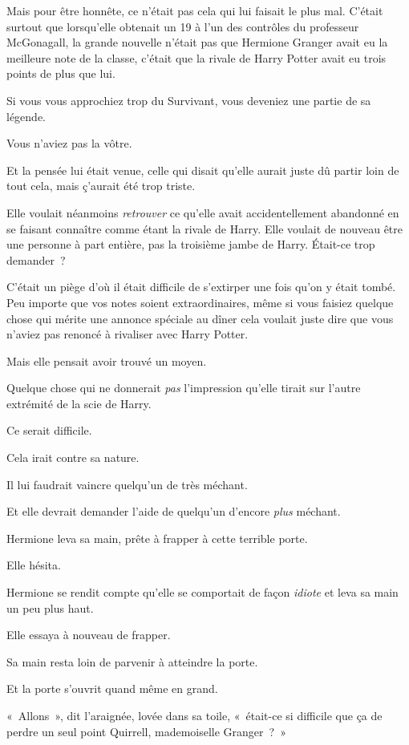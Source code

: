 Mais pour être honnête, ce n'était pas cela qui lui faisait le plus mal. C'était surtout que lorsqu'elle obtenait un 19 à l'un des contrôles du professeur McGonagall, la grande nouvelle n'était pas que Hermione Granger avait eu la meilleure note de la classe, c'était que la rivale de Harry Potter avait eu trois points de plus que lui.

Si vous vous approchiez trop du Survivant, vous deveniez une partie de sa légende.

Vous n'aviez pas la vôtre.

Et la pensée lui était venue, celle qui disait qu'elle aurait juste dû partir loin de tout cela, mais ç'aurait été trop triste.

Elle voulait néanmoins \emph{retrouver} ce qu'elle avait accidentellement abandonné en se faisant connaître comme étant la rivale de Harry. Elle voulait de nouveau être une personne à part entière, pas la troisième jambe de Harry. Était-ce trop demander~?

C'était un piège d'où il était difficile de s'extirper une fois qu'on y était tombé. Peu importe que vos notes soient extraordinaires, même si vous faisiez quelque chose qui mérite une annonce spéciale au dîner cela voulait juste dire que vous n'aviez pas renoncé à rivaliser avec Harry Potter.

Mais elle pensait avoir trouvé un moyen.

Quelque chose qui ne donnerait \emph{pas} l'impression qu'elle tirait sur l'autre extrémité de la scie de Harry.

Ce serait difficile.

Cela irait contre sa nature.

Il lui faudrait vaincre quelqu'un de très méchant.

Et elle devrait demander l'aide de quelqu'un d'encore \emph{plus} méchant.

Hermione leva sa main, prête à frapper à cette terrible porte.

Elle hésita.

Hermione se rendit compte qu'elle se comportait de façon \emph{idiote} et leva sa main un peu plus haut.

Elle essaya à nouveau de frapper.

Sa main resta loin de parvenir à atteindre la porte.

Et la porte s'ouvrit quand même en grand.

«~Allons~», dit l'araignée, lovée dans sa toile, «~était-ce si difficile que ça de perdre un seul point Quirrell, mademoiselle Granger~?~»

